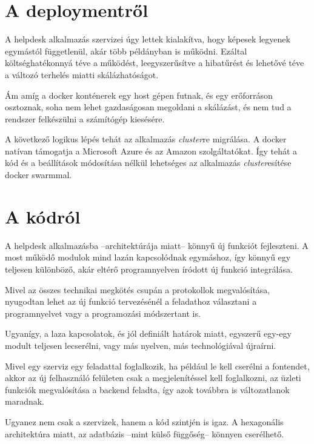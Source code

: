 \section{A deploymentről}

A helpdesk alkalmazás szervizei úgy lettek kialakítva, hogy képesek legyenek egymástól függetlenül, akár több példányban is működni. Ezáltal költséghatékonnyá téve a működést, leegyszerűsítve a hibatűrést és lehetővé téve a változó terhelés miatti skálázhatóságot.

Ám amíg a docker konténerek egy host gépen futnak, és egy erőforráson osztoznak, soha nem lehet gazdaságosan megoldani a skálázást, és nem tud a rendszer felkészülni a számítógép kiesésére.

A következő logikus lépés tehát az alkalmazás \textit{cluster}re migrálása. A docker natívan támogatja a Microsoft Azure és az Amazon \cite{docker_website_deploy_ECS} szolgáltatókat. Így tehát a kód és a beállítások módosítása nélkül lehetséges az alkalmazás \textit{cluster}esítése docker swarmmal.


\section{A kódról}
A helpdesk alkalmazásba --architektúrája miatt-- könnyű új funkciót fejleszteni. A most működő modulok mind lazán kapcsolódnak egymáshoz, így könnyű egy teljesen különböző, akár eltérő programnyelven íródott új funkció integrálása.

Mivel az összes technikai megkötés csupán a protokollok megvalósítása, nyugodtan lehet az új funkció tervezésénél a feladathoz választani a programnyelvet vagy a programozási módszertant is. 

Ugyanígy, a laza kapcsolatok, és jól definiált határok miatt, egyszerű egy-egy modult teljesen lecserélni, vagy más nyelven, más technológiával újraírni.

Mivel egy szerviz egy feladattal foglalkozik, ha például le kell cserélni a fontendet, akkor az új felhasználó felületen csak a megjelenítéssel kell foglalkozni, az üzleti funkciók megvalósítása a backend feladta, így azok továbbra is változatlanok maradnak.

Ugyanez nem csak a szervizek, hanem a kód szintjén is igaz. A hexagonális architektúra miatt, az adatbázis --mint külső függőség-- könnyen cserélhető. 




